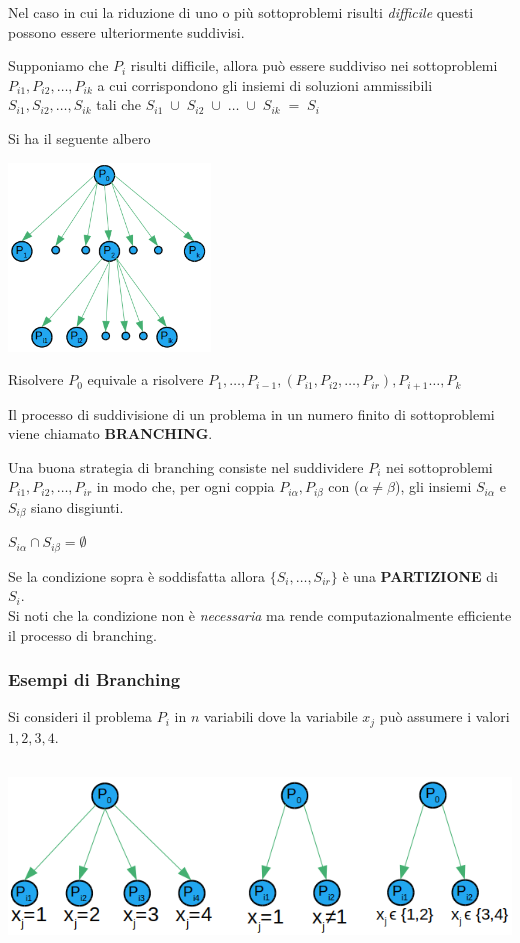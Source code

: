 Nel caso in cui la riduzione di uno o più sottoproblemi risulti \emph{difficile} questi possono essere ulteriormente suddivisi.

Supponiamo che $P_{i}$ risulti difficile, allora può essere suddiviso nei sottoproblemi $P_{i1},P_{i2},\dots,P_{ik}$ a cui corrispondono gli insiemi di soluzioni ammissibili $S_{i1},S_{i2},\dots,S_{ik}$ tali che $S_{i1}\;\cup\;S_{i2}\;\cup\;\dots\;\cup\;S_{ik}\;=\;S_{i}$

Si ha il seguente albero

\centerline{\includegraphics[height=5cm]{images/graph15.png}}

\noindent
Risolvere $P_{0}$ equivale a risolvere $P_{1},\dots,P_{i-1},(P_{i1},P_{i2},\dots,P_{ir}),P_{i+1}\dots,P_{k}$

Il processo di suddivisione di un problema in un numero finito di sottoproblemi viene chiamato \textbf{BRANCHING}.

Una buona strategia di branching consiste nel suddividere $P_{i}$ nei sottoproblemi $P_{i1},P_{i2},\dots,P_{ir}$ in modo che, per ogni coppia $P_{i\alpha},P_{i\beta}$ con ($\alpha \neq \beta$), gli insiemi $S_{i\alpha}$ e $S_{i\beta}$ siano disgiunti.

\centerline{$S_{i\alpha} \cap S_{i\beta} = \emptyset$}

Se la condizione sopra è soddisfatta allora $\{S_{i},\dots,S_{ir}\}$ è una \textbf{PARTIZIONE} di $S_{i}$.\\
Si noti che la condizione non è \emph{necessaria} ma rende computazionalmente efficiente il processo di branching.

\subsubsection{Esempi di Branching}
Si consideri il problema $P_{i}$ in $n$ variabili dove la variabile $x_{j}$ può assumere i valori $1,2,3,4$.

\centerline{\includegraphics[height=5cm]{images/graph16.png}}

